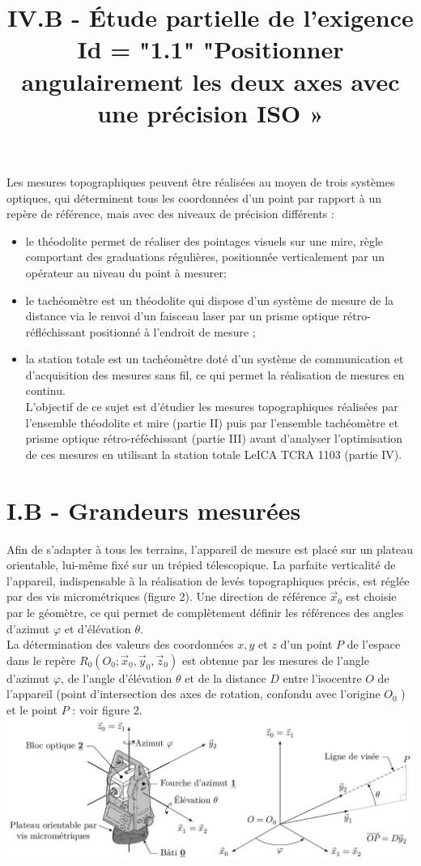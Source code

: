 \documentclass[10pt]{article}
\title{IV.B - Étude partielle de l'exigence Id = "1.1" "Positionner angulairement les deux axes avec une précision ISO » }
\author{}
\date{}
\begin{document}
\maketitle
Les mesures topographiques peuvent être réalisées au moyen de trois systèmes optiques, qui déterminent tous les coordonnées d'un point par rapport à un repère de référence, mais avec des niveaux de précision différents :

\begin{itemize}
  \item le théodolite permet de réaliser des pointages visuels sur une mire, règle comportant des graduations régulières, positionnée verticalement par un opérateur au niveau du point à mesurer;
  \item le tachéomètre est un théodolite qui dispose d'un système de mesure de la distance via le renvoi d'un faisceau laser par un prisme optique rétro-réfléchissant positionné à l'endroit de mesure ;
  \item la station totale est un tachéomètre doté d'un système de communication et d'acquisition des mesures sans fil, ce qui permet la réalisation de mesures en continu.\\
L'objectif de ce sujet est d'étudier les mesures topographiques réalisées par l'ensemble théodolite et mire (partie II) puis par l'ensemble tachéomètre et prisme optique rétro-réféchissant (partie III) avant d'analyser l'optimisation de ces mesures en utilisant la station totale LeICA TCRA 1103 (partie IV).
\end{itemize}

\section*{I.B - Grandeurs mesurées}
Afin de s'adapter à tous les terrains, l'appareil de mesure est placé sur un plateau orientable, lui-même fixé sur un trépied télescopique. La parfaite verticalité de l'appareil, indispensable à la réalisation de levés topographiques précis, est réglée par des vis micrométriques (figure 2). Une direction de référence $\vec{x}_{0}$ est choisie par le géomètre, ce qui permet de complètement définir les références des angles d'azimut $\varphi$ et d'élévation $\theta$.\\
La détermination des valeurs des coordonnées $x, y$ et $z$ d'un point $P$ de l'espace dans le repère $R_{0}\left(O_{0} ; \vec{x}_{0}, \vec{y}_{0}, \vec{z}_{0}\right)$ est obtenue par les mesures de l'angle d'azimut $\varphi$, de l'angle d'élévation $\theta$ et de la distance $D$ entre l'isocentre $O$ de l'appareil (point d'intersection des axes de rotation, confondu avec l'origine $O_{0}$ ) et le point $P$ : voir figure 2.\\
\includegraphics[max width=\textwidth, center]{2024_12_07_51b7f57c7f055c2d8d29g-02}
\end{document}
